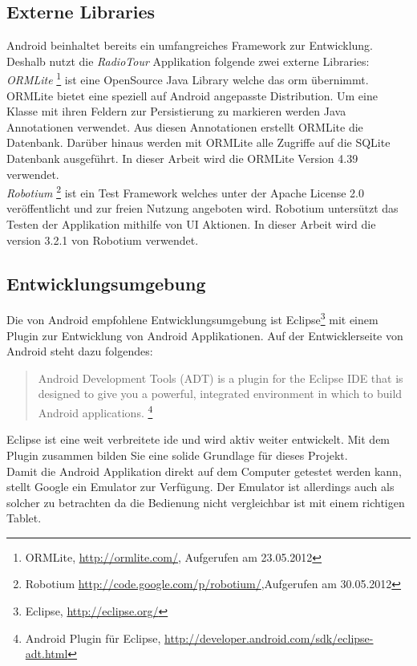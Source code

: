 \subsection{Externe Libraries}
Android beinhaltet bereits ein umfangreiches Framework zur Entwicklung. Deshalb nutzt die \textit{RadioTour} Applikation folgende zwei externe Libraries:
\\
\textit{ORMLite} \footnote{ORMLite, \url{http://ormlite.com/}, Aufgerufen am 23.05.2012} ist eine OpenSource Java Library welche das \gls{orm} übernimmt. ORMLite bietet eine speziell auf Android angepasste Distribution. Um eine Klasse mit ihren Feldern zur Persistierung zu markieren werden Java Annotationen verwendet. Aus diesen Annotationen erstellt ORMLite die Datenbank. Darüber hinaus werden mit ORMLite alle Zugriffe auf die SQLite Datenbank ausgeführt. In dieser Arbeit wird die ORMLite Version 4.39 verwendet.
\\
\textit{Robotium} \footnote{Robotium \url{http://code.google.com/p/robotium/},Aufgerufen am 30.05.2012} ist ein Test Framework welches unter der Apache License 2.0 veröffentlicht und zur freien Nutzung angeboten wird. Robotium untersützt das Testen der Applikation mithilfe von UI Aktionen. In dieser Arbeit wird die version 3.2.1 von Robotium verwendet.  


\subsection{Entwicklungsumgebung}
Die von Android empfohlene Entwicklungsumgebung ist Eclipse\footnote{Eclipse, \url{http://eclipse.org/}} mit einem Plugin zur Entwicklung von Android Applikationen. Auf der Entwicklerseite von Android steht dazu folgendes:
\begin{quote}
\grqq Android Development Tools (ADT) is a plugin for the Eclipse IDE that is designed to give you a powerful, integrated environment in which to build Android applications.\grqq
\footnote{Android Plugin für Eclipse, \url{http://developer.android.com/sdk/eclipse-adt.html}}
\end{quote}
Eclipse ist eine weit verbreitete \gls{ide} und wird aktiv weiter entwickelt. Mit dem Plugin zusammen bilden Sie eine solide Grundlage für dieses Projekt.
\\
Damit die Android Applikation direkt auf dem Computer getestet werden kann, stellt Google ein Emulator zur Verfügung. Der Emulator ist allerdings auch als solcher zu betrachten da die Bedienung nicht vergleichbar ist mit einem richtigen Tablet.

